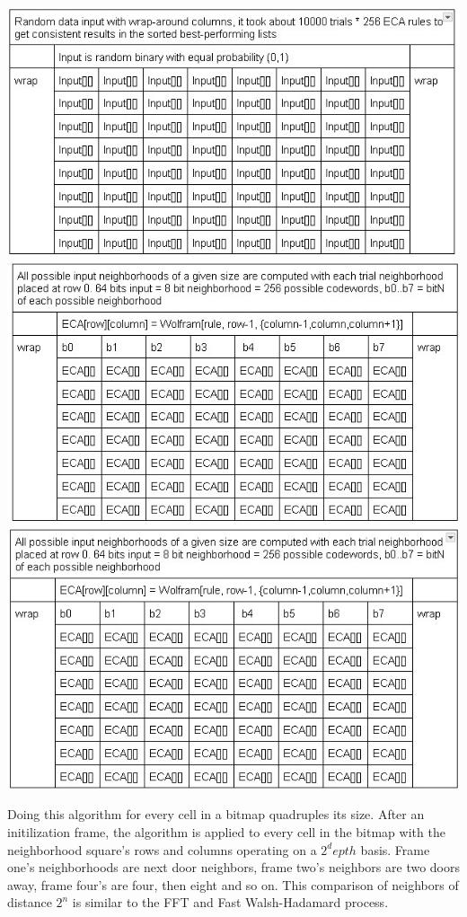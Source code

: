 \documentclass[11pt]{article}
\begin{document}
\begin{center}
\includegraphics{WrappedInput}\\
\includegraphics{ECAspace}\\
\includegraphics{ErrorScore}\\
\end{center}

Doing this algorithm for every cell in a bitmap quadruples its size. After an initilization frame, the algorithm is applied to every cell in the bitmap with the neighborhood square's rows and columns operating on a $2^depth$ basis. Frame one's neighborhoods are next door neighbors, frame two's neighbors are two doors away, frame four's are four, then eight and so on. This comparison of neighbors of distance $2^n$ is similar to the FFT and Fast Walsh-Hadamard process.\\
\end{document}
